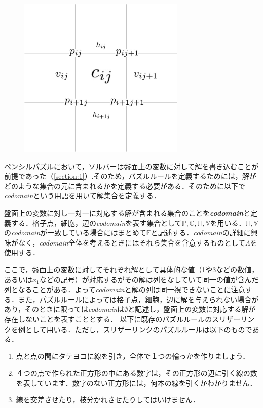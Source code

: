 \begin{figure}[htbp]
  \centering
  \includegraphics[width=8cm,clip]{fig/define.png}
  \caption{}
  \label{fig:VariableAtBoard}
\end{figure}

ペンシルパズルにおいて，ソルバーは盤面上の変数に対して解を書き込むことが前提であった（\ref{section:1}）.そのため，パズルルールを定義するためには，解がどのような集合の元に含まれるかを定義する必要がある．そのために以下で\textit{codomain}という用語を用いて解集合を定義する．

\begin{definition}\label{definition:Codomain}
  盤面上の変数に対し一対一に対応する解が含まれる集合のことを\textbf{\textit{codomain}}と定義する．格子点，細胞，辺の\textit{codomain}を表す集合として$\mathbb{P},\mathbb{C},\mathbb{H},\mathbb{V}$を用いる．$\mathbb{H},\mathbb{V}$の\textit{codomain}が一致している場合にはまとめて$\mathbb{E}$と記述する．\textit{codomain}の詳細に興味がなく，\textit{codomain}全体を考えるときにはそれら集合を含意するものとして$\Lambda$を使用する．
\end{definition}

ここで，盤面上の変数に対してそれぞれ解として具体的な値（1や3などの数値，あるいは$x_1$などの記号）が対応するがその解は列をなしていて同一の値が含んだ列となることがある．よって\textit{codomain}と解の列は同一視できないことに注意する．また，パズルルールによっては格子点，細胞，辺に解を与えられない場合があり，そのときに限っては\textit{codomain}は$\emptyset$と記述し，盤面上の変数に対応する解が存在しないことを表すこととする．
以下に既存のパズルルールのスリザーリンクを例として用いる．ただし，スリザーリンクのパズルルールは以下のものである．\cite{web:SlitherLink}

\begin{enumerate}
  \item 点と点の間にタテヨコに線を引き，全体で１つの輪っかを作りましょう．
  \item ４つの点で作られた正方形の中にある数字は，その正方形の辺に引く線の数を表しています．数字のない正方形には，何本の線を引くかわかりません．
  \item 線を交差させたり，枝分かれさせたりしてはいけません．
\end{enumerate}

